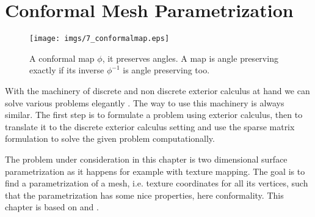 \chapter{Conformal Mesh Parametrization}
\label{chap:meshparam}

\begin{figure}[h]%
\begin{center}
\texttt{[image: imgs/7\_conformalmap.eps]}%
\end{center}
\caption{A conformal map $\phi$, it preserves angles. A map is angle preserving exactly if its inverse $\phi^{-1}$ is angle preserving too.}%
\label{fig:7_conformalmap}%
\end{figure}
	
With the machinery of discrete and non discrete exterior calculus at hand we can solve various problems elegantly . The way to use this machinery is always similar. The first step is to formulate a problem using exterior calculus, then to translate it to the discrete exterior calculus setting and use the sparse matrix formulation to solve the given problem computationally.

The problem under consideration in this chapter is two dimensional surface parametrization as it happens for example with texture mapping. The goal is to find a parametrization of a mesh, i.e. texture coordinates for all its vertices, such that the parametrization has some nice properties, here conformality. This chapter is based on \cite{Gortler} and \cite{meshpar1}.

